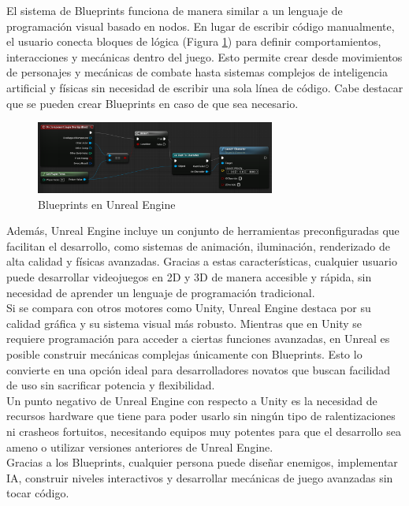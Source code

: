 El sistema de Blueprints funciona de manera similar a un lenguaje de programación visual basado en nodos. En lugar de escribir código manualmente, el usuario conecta bloques de lógica (Figura \ref{fig:BluePrints_Figure}) para definir comportamientos, interacciones y mecánicas dentro del juego. Esto permite crear desde movimientos de personajes y mecánicas de combate hasta sistemas complejos de inteligencia artificial y físicas sin necesidad de escribir una sola línea de código. Cabe destacar que se pueden crear Blueprints en caso de que sea necesario.\\
\begin{figure}[t]
	\centering
	\includegraphics[width = 0.7\textwidth]{Imagenes/Blueprints.png}
	\caption{Blueprints en Unreal Engine}
	\label{fig:BluePrints_Figure}
\end{figure}

Además, Unreal Engine incluye un conjunto de herramientas preconfiguradas que facilitan el desarrollo, como sistemas de animación, iluminación, renderizado de alta calidad y físicas avanzadas. Gracias a estas características, cualquier usuario puede desarrollar videojuegos en 2D y 3D de manera accesible y rápida, sin necesidad de aprender un lenguaje de programación tradicional.\\

Si se compara con otros motores como Unity, Unreal Engine destaca por su calidad gráfica y su sistema visual más robusto. Mientras que en Unity se requiere programación para acceder a ciertas funciones avanzadas, en Unreal es posible construir mecánicas complejas únicamente con Blueprints. Esto lo convierte en una opción ideal para desarrolladores novatos que buscan facilidad de uso sin sacrificar potencia y flexibilidad.\\

Un punto negativo de Unreal Engine con respecto a Unity es la necesidad de recursos hardware que tiene para poder usarlo sin ningún tipo de ralentizaciones ni crasheos fortuitos, necesitando equipos muy potentes para que el desarrollo sea ameno o utilizar versiones anteriores de Unreal Engine.\\

Gracias a los Blueprints, cualquier persona puede diseñar enemigos, implementar IA, construir niveles interactivos y desarrollar mecánicas de juego avanzadas sin tocar código. 
